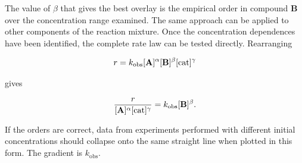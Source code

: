 {{%
  }
}

The value of $\beta$ that gives the best overlay is the empirical order in compound \textbf{B} over the concentration range examined.
The same approach can be applied to other components of the reaction mixture.
Once the concentration dependences have been identified, the complete rate law can be tested directly.
Rearranging

\begin{equation}
  r = k_{\mathrm{obs}}
      [\text{\textbf{A}}]^{\alpha}
      [\text{\textbf{B}}]^{\beta}
      [\mathrm{cat}]^{\gamma}
\end{equation}

gives

\begin{equation}
  \frac{r}{[\text{\textbf{A}}]^{\alpha}[\mathrm{cat}]^{\gamma}}
  = k_{\mathrm{obs}}[\text{\textbf{B}}]^{\beta}.
\end{equation}

If the orders are correct, data from experiments performed with different initial concentrations should collapse onto the same straight line when plotted in this form.
The gradient is $k_{\mathrm{obs}}$.

